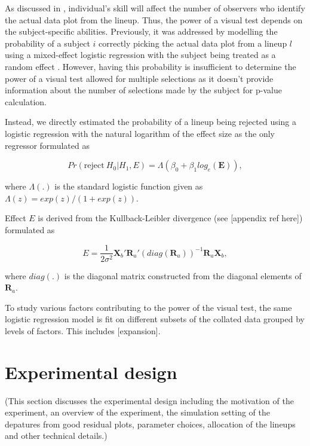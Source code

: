 \documentclass[]{interact}
\theoremstyle{plain}%
\theoremstyle{definition}
\theoremstyle{remark}
\begin{document}
As discussed in \citet{majumder_validation_2013}, individual's skill
will affect the number of observers who identify the actual data plot
from the lineup. Thus, the power of a visual test depends on the
subject-specific abilities. Previously, it was addressed by modelling
the probability of a subject \(i\) correctly picking the actual data
plot from a lineup \(l\) using a mixed-effect logistic regression with
the subject being treated as a random effect
\citep{majumder_validation_2013}. However, having this probability is
insufficient to determine the power of a visual test allowed for
multiple selections as it doesn't provide information about the number
of selections made by the subject for p-value calculation.

Instead, we directly estimated the probability of a lineup being
rejected using a logistic regression with the natural logarithm of the
effect size as the only regressor formulated as

\begin{equation} \label{eq:logistic-regression-1-1}
Pr(\text{reject}~H_0|H_1,E) = \Lambda(\beta_0 + \beta_1 log_e(\boldsymbol{E})),
\end{equation}

where \(\Lambda(.)\) is the standard logistic function given as
\(\Lambda(z) = exp(z)/(1+exp(z))\).

Effect \(E\) is derived from the Kullback-Leibler divergence (see
{[}appendix ref here{]}) formulated as

\begin{equation} \label{eq:effect-size-ex1}
E = \frac{1}{2\sigma^2}\boldsymbol{X}_b'\boldsymbol{R}_a'(diag(\boldsymbol{R}_a))^{-1}\boldsymbol{R}_a\boldsymbol{X}_b,
\end{equation}

where \(diag(.)\) is the diagonal matrix constructed from the diagonal
elements of \(\boldsymbol{R}_a\).

To study various factors contributing to the power of the visual test,
the same logistic regression model is fit on different subsets of the
collated data grouped by levels of factors. This includes
{[}expansion{]}.

\hypertarget{experimental-design}{%
\section{Experimental design}\label{experimental-design}}

(This section discusses the experimental design including the motivation
of the experiment, an overview of the experiment, the simulation setting
of the depatures from good residual plots, parameter choices, allocation
of the lineups and other technical details.)
\end{document}
